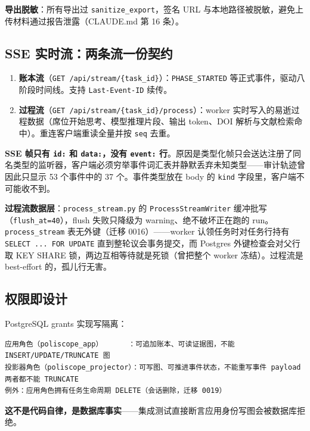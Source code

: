 \textbf{导出脱敏}：所有导出过 \texttt{sanitize\_export}，签名 URL 与本地路径被脱敏，避免上传材料通过报告泄露（CLAUDE.md 第 16 条）。

\subsection{SSE 实时流：两条流一份契约}

\begin{enumerate}
\item \textbf{账本流}（\texttt{GET /api/stream/\{task\_id\}}）：\texttt{PHASE\_STARTED} 等正式事件，驱动八阶段时间线。支持 \texttt{Last-Event-ID} 续传。
\item \textbf{过程流}（\texttt{GET /api/stream/\{task\_id\}/process}）：worker 实时写入的易逝过程数据（席位开始思考、模型推理片段、输出 token、DOI 解析与文献检索命中）。重连客户端重读全量并按 \texttt{seq} 去重。
\end{enumerate}

\textbf{SSE 帧只有 \texttt{id:} 和 \texttt{data:}，没有 \texttt{event:} 行}。原因是类型化帧只会送达注册了同名类型的监听器，客户端必须穷举事件词汇表并静默丢弃未知类型——审计轨迹曾因此只显示 53 个事件中的 37 个。事件类型放在 body 的 \texttt{kind} 字段里，客户端不可能收不到。

\textbf{过程流数据层}：\texttt{process\_stream.py} 的 \texttt{ProcessStreamWriter} 缓冲批写（\texttt{flush\_at=40}），flush 失败只降级为 warning、绝不破坏正在跑的 run。\texttt{process\_stream} 表无外键（迁移 0016）——worker 认领任务时对任务行持有 \texttt{SELECT ... FOR UPDATE} 直到整轮议会事务提交，而 Postgres 外键检查会对父行取 KEY SHARE 锁，两边互相等待就是死锁（曾把整个 worker 冻结）。过程流是 best-effort 的，孤儿行无害。

\subsection{权限即设计}

PostgreSQL grants 实现写隔离：

\begin{lstlisting}
应用角色（poliscope_app）      ：可追加账本、可读证据图，不能 INSERT/UPDATE/TRUNCATE 图
投影器角色（poliscope_projector）：可写图、可推进事件状态，不能重写事件 payload
两者都不能 TRUNCATE
例外：应用角色拥有任务生命周期 DELETE（会话删除，迁移 0019）
\end{lstlisting}

\textbf{这不是代码自律，是数据库事实}——集成测试直接断言应用身份写图会被数据库拒绝。

